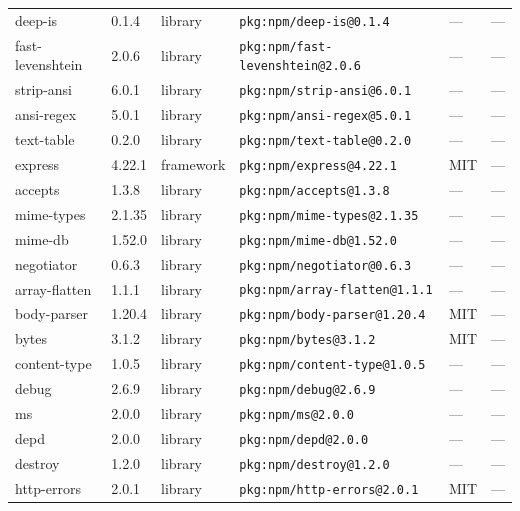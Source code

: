\documentclass[11pt,a4paper]{article}
\begin{document}
\begin{longtable}{|p{4cm}|p{2cm}|p{1.6cm}|p{5cm}|p{1.5cm}|p{3.5cm}|}
\raggedright deep-is & 0.1.4 & library & \small\texttt{pkg:npm/deep-is@0.1.4} & — & \small — \\
\raggedright fast-levenshtein & 2.0.6 & library & \small\texttt{pkg:npm/fast-levenshtein@2.0.6} & — & \small — \\
\raggedright strip-ansi & 6.0.1 & library & \small\texttt{pkg:npm/strip-ansi@6.0.1} & — & \small — \\
\raggedright ansi-regex & 5.0.1 & library & \small\texttt{pkg:npm/ansi-regex@5.0.1} & — & \small — \\
\raggedright text-table & 0.2.0 & library & \small\texttt{pkg:npm/text-table@0.2.0} & — & \small — \\
\raggedright express & 4.22.1 & framework & \small\texttt{pkg:npm/express@4.22.1} & MIT & \small — \\
\raggedright accepts & 1.3.8 & library & \small\texttt{pkg:npm/accepts@1.3.8} & — & \small — \\
\raggedright mime-types & 2.1.35 & library & \small\texttt{pkg:npm/mime-types@2.1.35} & — & \small — \\
\raggedright mime-db & 1.52.0 & library & \small\texttt{pkg:npm/mime-db@1.52.0} & — & \small — \\
\raggedright negotiator & 0.6.3 & library & \small\texttt{pkg:npm/negotiator@0.6.3} & — & \small — \\
\raggedright array-flatten & 1.1.1 & library & \small\texttt{pkg:npm/array-flatten@1.1.1} & — & \small — \\
\raggedright body-parser & 1.20.4 & library & \small\texttt{pkg:npm/body-parser@1.20.4} & MIT & \small — \\
\raggedright bytes & 3.1.2 & library & \small\texttt{pkg:npm/bytes@3.1.2} & MIT & \small — \\
\raggedright content-type & 1.0.5 & library & \small\texttt{pkg:npm/content-type@1.0.5} & — & \small — \\
\raggedright debug & 2.6.9 & library & \small\texttt{pkg:npm/debug@2.6.9} & — & \small — \\
\raggedright ms & 2.0.0 & library & \small\texttt{pkg:npm/ms@2.0.0} & — & \small — \\
\raggedright depd & 2.0.0 & library & \small\texttt{pkg:npm/depd@2.0.0} & — & \small — \\
\raggedright destroy & 1.2.0 & library & \small\texttt{pkg:npm/destroy@1.2.0} & — & \small — \\
\raggedright http-errors & 2.0.1 & library & \small\texttt{pkg:npm/http-errors@2.0.1} & MIT & \small — \\

\end{longtable}
\end{document}
